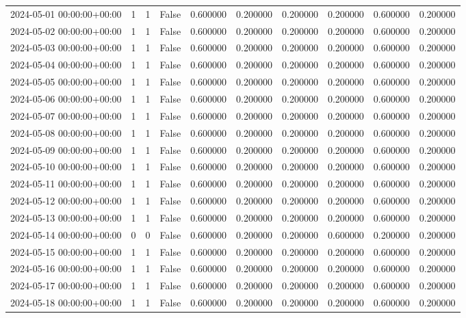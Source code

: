 \begin{tabular}{lrrrrrrrrr}
2024-05-01 00:00:00+00:00 & 1 & 1 & False & 0.600000 & 0.200000 & 0.200000 & 0.200000 & 0.600000 & 0.200000 \\
2024-05-02 00:00:00+00:00 & 1 & 1 & False & 0.600000 & 0.200000 & 0.200000 & 0.200000 & 0.600000 & 0.200000 \\
2024-05-03 00:00:00+00:00 & 1 & 1 & False & 0.600000 & 0.200000 & 0.200000 & 0.200000 & 0.600000 & 0.200000 \\
2024-05-04 00:00:00+00:00 & 1 & 1 & False & 0.600000 & 0.200000 & 0.200000 & 0.200000 & 0.600000 & 0.200000 \\
2024-05-05 00:00:00+00:00 & 1 & 1 & False & 0.600000 & 0.200000 & 0.200000 & 0.200000 & 0.600000 & 0.200000 \\
2024-05-06 00:00:00+00:00 & 1 & 1 & False & 0.600000 & 0.200000 & 0.200000 & 0.200000 & 0.600000 & 0.200000 \\
2024-05-07 00:00:00+00:00 & 1 & 1 & False & 0.600000 & 0.200000 & 0.200000 & 0.200000 & 0.600000 & 0.200000 \\
2024-05-08 00:00:00+00:00 & 1 & 1 & False & 0.600000 & 0.200000 & 0.200000 & 0.200000 & 0.600000 & 0.200000 \\
2024-05-09 00:00:00+00:00 & 1 & 1 & False & 0.600000 & 0.200000 & 0.200000 & 0.200000 & 0.600000 & 0.200000 \\
2024-05-10 00:00:00+00:00 & 1 & 1 & False & 0.600000 & 0.200000 & 0.200000 & 0.200000 & 0.600000 & 0.200000 \\
2024-05-11 00:00:00+00:00 & 1 & 1 & False & 0.600000 & 0.200000 & 0.200000 & 0.200000 & 0.600000 & 0.200000 \\
2024-05-12 00:00:00+00:00 & 1 & 1 & False & 0.600000 & 0.200000 & 0.200000 & 0.200000 & 0.600000 & 0.200000 \\
2024-05-13 00:00:00+00:00 & 1 & 1 & False & 0.600000 & 0.200000 & 0.200000 & 0.200000 & 0.600000 & 0.200000 \\
2024-05-14 00:00:00+00:00 & 0 & 0 & False & 0.600000 & 0.200000 & 0.200000 & 0.600000 & 0.200000 & 0.200000 \\
2024-05-15 00:00:00+00:00 & 1 & 1 & False & 0.600000 & 0.200000 & 0.200000 & 0.200000 & 0.600000 & 0.200000 \\
2024-05-16 00:00:00+00:00 & 1 & 1 & False & 0.600000 & 0.200000 & 0.200000 & 0.200000 & 0.600000 & 0.200000 \\
2024-05-17 00:00:00+00:00 & 1 & 1 & False & 0.600000 & 0.200000 & 0.200000 & 0.200000 & 0.600000 & 0.200000 \\
2024-05-18 00:00:00+00:00 & 1 & 1 & False & 0.600000 & 0.200000 & 0.200000 & 0.200000 & 0.600000 & 0.200000 \\

\end{tabular}
